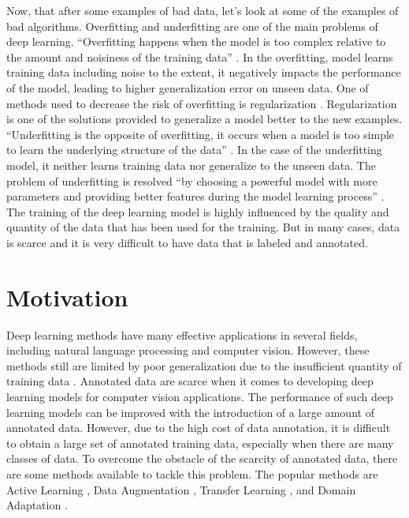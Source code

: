Now, that after some examples of bad data, let's look at some of the examples of bad algorithms. Overfitting and underfitting are one of the main problems of deep learning. ``Overfitting happens when the model is too complex relative to the amount and noisiness of the training data'' \cite{10.5555/3153997}. In the overfitting, model learns training data including noise to the extent, it negatively impacts the performance of the model, leading to higher generalization error on unseen data. One of methods used to decrease the risk of overfitting is regularization \cite{kukacka2017regularization}. Regularization is one of the solutions provided to generalize a model better to the new examples. ``Underfitting is the opposite of overfitting, it occurs when a model is too simple to learn the underlying structure of the data'' \cite{10.5555/3153997}. In the case of the underfitting model, it neither learns training data nor generalize to the unseen data. The problem of underfitting is resolved ``by choosing a powerful model with more parameters and providing better features during the model learning process'' \cite{10.5555/3153997}. The training of the deep learning model is highly influenced by the quality and quantity of the data that has been used for the training. But in many cases, data is scarce and it is very difficult to have data that is labeled and annotated.





\section{Motivation}\label{motivation}

Deep learning methods have many effective applications in several fields, including natural language processing and computer vision. However, these methods still are limited by poor generalization due to the insufficient quantity of training data \cite{8978087}. Annotated data are scarce when it comes to developing deep learning models for computer vision applications. The performance of such deep learning models can be improved with the introduction of a large amount of annotated data. However, due to the high cost of data annotation, it is difficult to obtain a large set of annotated training data, especially when there are many classes of data. To overcome the obstacle of the scarcity of annotated data, there are some methods available to tackle this problem. The popular methods are Active Learning \cite{hemmer2020deal}, Data Augmentation \cite{Shorten.2019}, Transfer Learning \cite{zhuang2020comprehensive}, and Domain Adaptation \cite{redko2020survey}. 

